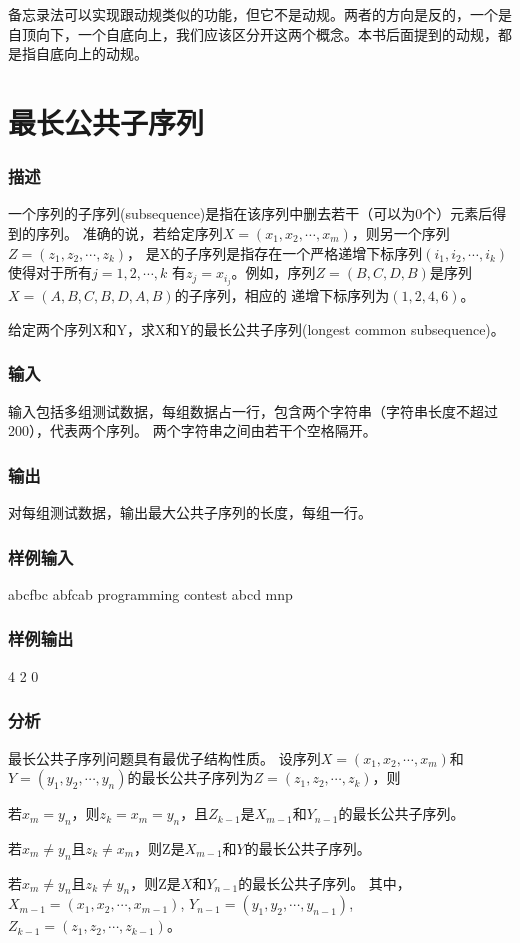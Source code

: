 备忘录法可以实现跟动规类似的功能，但它不是动规。两者的方向是反的，一个是自顶向下，一个自底向上，我们应该区分开这两个概念。本书后面提到的动规，都是指自底向上的动规。


\section{最长公共子序列} %
\subsubsection{描述}
一个序列的子序列(subsequence)是指在该序列中删去若干（可以为0个）元素后得到的序列。
准确的说，若给定序列$X=(x_1,x_2,\cdots,x_m)$，则另一个序列$Z=(z_1,z_2,\cdots,z_k)$，
是X的子序列是指存在一个严格递增下标序列$(i_1,i_2,\cdots,i_k)$使得对于所有$j=1,2,\cdots,k$
有$z_j=x_{i_j}$。例如，序列$Z=(B,C,D,B)$是序列$X=(A,B,C,B,D,A,B)$的子序列，相应的
递增下标序列为$(1,2,4,6)$。

给定两个序列X和Y，求X和Y的最长公共子序列(longest common subsequence)。

\subsubsection{输入}
输入包括多组测试数据，每组数据占一行，包含两个字符串（字符串长度不超过200），代表两个序列。
两个字符串之间由若干个空格隔开。

\subsubsection{输出}
对每组测试数据，输出最大公共子序列的长度，每组一行。

\subsubsection{样例输入}
\begin{Code}
abcfbc abfcab
programming contest 
abcd mnp
\end{Code}

\subsubsection{样例输出}
\begin{Code}
4
2
0
\end{Code}

\subsubsection{分析}
最长公共子序列问题具有最优子结构性质。
设序列$X=(x_1,x_2,\cdots,x_m)$和$Y=(y_1,y_2,\cdots,y_n)$的最长公共子序列为$Z=(z_1,z_2,\cdots,z_k)$，则
\begindot
\item 若$x_m=y_n$，则$z_k=x_m=y_n$，且$Z_{k-1}$是$X_{m-1}$和$Y_{n-1}$的最长公共子序列。
\item 若$x_m \neq y_n$且$z_k \neq x_m$，则Z是$X_{m-1}$和$Y$的最长公共子序列。
\item 若$x_m \neq y_n$且$z_k \neq y_n$，则Z是$X$和$Y_{n-1}$的最长公共子序列。
\myenddot
其中，$X_{m-1}=(x_1,x_2,\cdots,x_{m-1})$, $Y_{n-1}=(y_1,y_2,\cdots,y_{n-1})$, $Z_{k-1}=(z_1,z_2,\cdots,z_{k-1})$。

